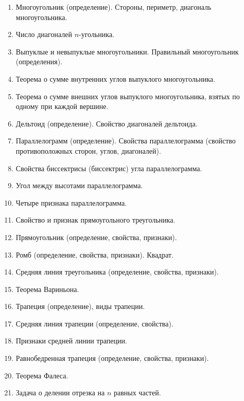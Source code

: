 \documentclass{article}
\begin{document}
    \begin{large}
        \begin{enumerate}[label=\arabic*)]
            \item Многоугольник (определение).
            Стороны, периметр, диагональ многоугольника.
            \item Число диагоналей $n$-угольника.
            \item Выпуклые и невыпуклые многоугольники.
            Правильный многоугольник (определения).
            \item Теорема о сумме внутренних углов выпуклого многоугольника.
            \item Теорема о сумме внешних углов выпуклого многоугольника,
            взятых по одному при каждой вершине.
            \item Дельтоид (определение).
            Свойство диагоналей дельтоида.
            \item Параллелограмм (определение).
            Свойства параллелограмма (свойство противоположных сторон, углов, диагоналей).
            \item Свойства биссектрисы (биссектрис) угла параллелограмма.
            \item Угол между высотами параллелограмма.
            \item Четыре признака параллелограмма.
            \item Свойство и признак прямоугольного треугольника.
            \item Прямоугольник (определение, свойства, признаки).
            \item Ромб (определение, свойства, признаки). Квадрат.
            \item Средняя линия треугольника (определение, свойства, признаки).
            \item Теорема Вариньона.
            \item Трапеция (определение), виды трапеции.
            \item Средняя линия трапеции (определение, свойства).
            \item Признаки средней линии трапеции.
            \item Равнобедренная трапеция (определение, свойства, признаки).
            \item Теорема Фалеса.
            \item Задача о делении отрезка на $n$ равных частей.
        \end{enumerate}
    \end{large}
\end{document}
